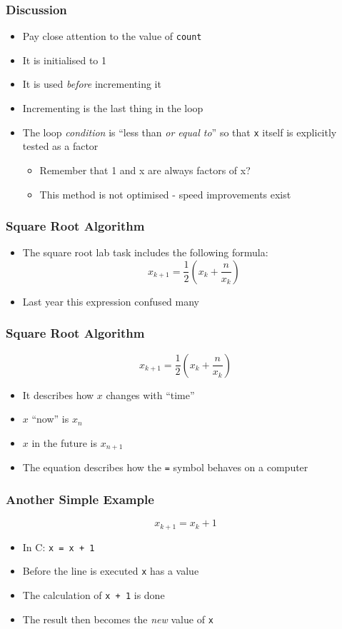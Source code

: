 \documentclass[14pt]{beamer}
\begin{document}
\begin{frame}
\frametitle{Discussion}
\begin{itemize}
\item Pay close attention to the value of \texttt{count}
\item It is initialised to 1
\item It is used \textit{before} incrementing it
\item Incrementing is the last thing in the loop
\item The loop \textit{condition} is ``less than \textit{or equal to}'' so that \texttt{x} itself is explicitly tested as a factor
	\begin{itemize}
		\item Remember that 1 and x are always factors of x? 
		\item This method is not optimised - speed improvements exist
	\end{itemize}
\end{itemize}
\end{frame}

\begin{frame}
\frametitle{Square Root Algorithm}
\begin{itemize}
\item The square root lab task includes the following formula:
\begin{equation}\label{eq:sqrt}
x_{k+1} = \frac{1}{2}\left(x_k + \frac{n}{x_k}\right)
\end{equation}
\item Last year this expression confused many
\end{itemize}
\end{frame}

\begin{frame}
\frametitle{Square Root Algorithm}
\begin{equation}\label{eq:sqrt}
x_{k+1} = \frac{1}{2}\left(x_k + \frac{n}{x_k}\right)
\end{equation}
\begin{itemize}
\item It describes how $x$ changes with ``time''
\item $x$ ``now'' is $x_n$
\item $x$ in the future is $x_{n+1}$
\item The equation describes how the \texttt{=} symbol behaves on a computer
\end{itemize}
\end{frame}

\begin{frame}
\frametitle{Another Simple Example}
\begin{equation}
x_{k+1} = x_k + 1
\end{equation}
\begin{itemize}
\item In C: \texttt{x = x + 1}
\item Before the line is executed \texttt{x} has a value
\item The calculation of \texttt{x + 1} is done
\item The result then becomes the \textit{new} value of \texttt{x}
\end{itemize}
\end{frame}
\end{document}
